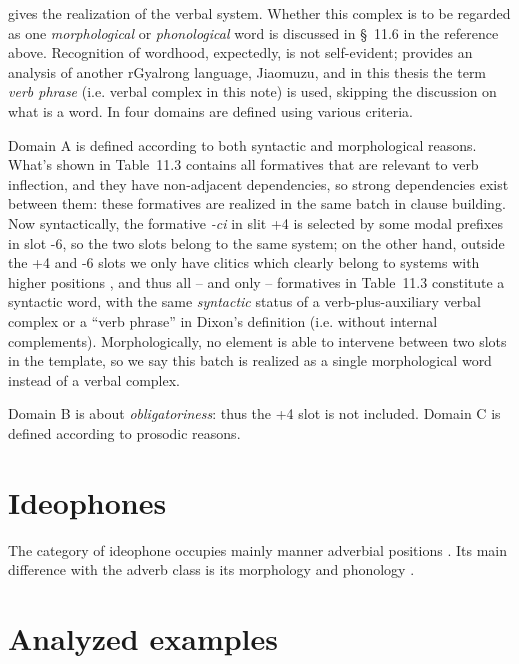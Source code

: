 \documentclass[a4paper, oneside, 12pt]{report}
\newcommand*{\citesec}[1]{\S~{#1}}
\newcommand*{\citechap}[1]{Ch~{#1}}
\newcommand*{\citetable}[1]{Table~{#1}}
\newcommand*{\term}[1]{\emph{#1}}
\newcommand{\form}[1]{\emph{#1}}
\begin{document}
\citet[\citechap{11}]{jacques2021grammar} gives 
the realization of the verbal system. 
Whether this complex is to be regarded as one \emph{morphological} or \emph{phonological} word 
is discussed in \citesec{11.6}
in the reference above.
Recognition of wordhood, expectedly, is not self-evident;
\citet{prins2011web} provides an analysis of another rGyalrong language, Jiaomuzu, 
and in this thesis the term \term{verb phrase} 
(i.e. verbal complex in this note) is used,
skipping the discussion on what is a word.
In \citet[\citetable{11.3}]{jacques2021grammar}
four domains are defined using various criteria.

Domain A is defined according to both syntactic and morphological reasons.
What's shown in 
\citetable{11.3} contains all formatives that are relevant to verb inflection,
and they have non-adjacent dependencies,
so strong dependencies exist between them:
these formatives are realized in the same batch 
in clause building.
Now syntactically, the formative \form{-ci} in slit +4 
is selected by some modal prefixes in slot -6,
so the two slots belong to the same system;
on the other hand, outside the +4 and -6 slots 
we only have clitics which clearly belong to systems with higher positions
\citep[\citesec{11.6.2}]{jacques2021grammar},
and thus all -- and only -- formatives in \citetable{11.3}
constitute a syntactic word,
with the same \emph{syntactic} status of a verb-plus-auxiliary verbal complex or a
``verb phrase'' in Dixon's definition (i.e. without internal complements). 
Morphologically, no element is able to intervene 
between two slots in the template, 
so we say this batch is realized as a single morphological word 
instead of a verbal complex.

Domain B is about \emph{obligatoriness}:
thus the +4 slot is not included.
Domain C is defined according to prosodic reasons.

\section{Ideophones}

The category of ideophone occupies mainly manner adverbial positions
\citep[\citesec{10.1.7}]{jacques2021grammar}.
Its main difference with the adverb class 
is its morphology \citep[\citesec{10.1.2}]{jacques2021grammar}
and phonology \citep[\citesec{10.1.5}]{jacques2021grammar}.

\section{Analyzed examples}
\end{document}
